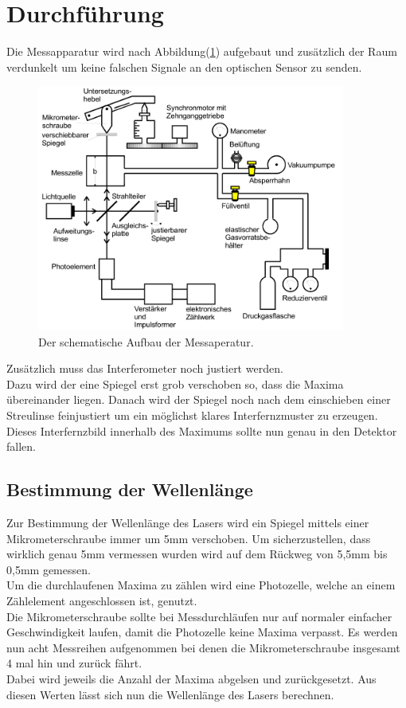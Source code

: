 \section{Durchführung}

    \noindent Die Messapparatur wird nach Abbildung(\ref{img:6}) aufgebaut und zusätzlich der Raum verdunkelt um keine falschen Signale an den optischen 
    Sensor zu senden.
    
    \begin{figure}[ht]
        \centering
        \includegraphics[width=0.9\textwidth]{latex/images/MessApp.PNG}
        \caption{Der schematische Aufbau der Messaperatur\protect \cite{V401}.}
        \label{img:6}
    \end{figure}

    \noindent Zusätzlich muss das Interferometer noch justiert werden.\\ Dazu wird der eine Spiegel erst grob verschoben so, dass die Maxima 
    übereinander liegen. Danach wird der Spiegel noch nach dem einschieben einer Streulinse feinjustiert um ein möglichst klares Interfernzmuster zu erzeugen. Dieses Interfernzbild 
    innerhalb des Maximums sollte nun genau in den Detektor fallen.

    \subsection{Bestimmung der Wellenlänge}

        \noindent Zur Bestimmung der Wellenlänge des Lasers wird ein Spiegel mittels einer Mikrometerschraube immer um 5mm verschoben. Um 
        sicherzustellen, dass wirklich genau 5mm vermessen wurden wird auf dem Rückweg von 5,5mm bis 0,5mm gemessen.\\ Um die durchlaufenen 
        Maxima zu zählen wird eine Photozelle, welche an einem Zählelement angeschlossen ist, genutzt.\\ Die Mikrometerschraube sollte bei 
        Messdurchläufen nur auf normaler einfacher Geschwindigkeit laufen, damit die Photozelle keine Maxima verpasst. Es werden nun acht Messreihen 
        aufgenommen bei denen die Mikrometerschraube insgesamt 4 mal hin und zurück fährt.\\ Dabei wird jeweils die Anzahl der Maxima abgelsen und 
        zurückgesetzt. Aus diesen Werten lässt sich nun die Wellenlänge des Lasers berechnen.

